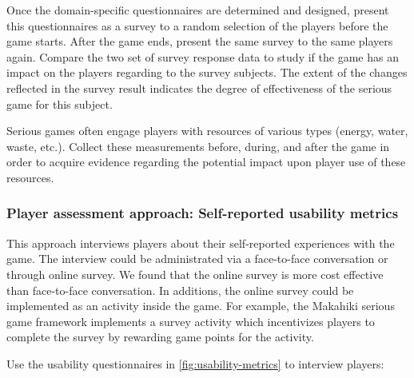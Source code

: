 \documentclass[11pt,oneside]{book}
\begin{document}
Once the domain-specific questionnaires are determined and designed, present this questionnaires as a survey to a random selection of the players before the game starts. After the game ends, present the same survey to the
same players again. Compare the two set of survey response data to study if the game has an impact on the players regarding to the survey subjects. The extent of the changes reflected in the survey result indicates the degree of effectiveness of the serious game for this subject.

Serious games often engage players with resources of various types (energy, water, waste, etc.). Collect these measurements before, during, and after the game in order to acquire evidence regarding the potential impact upon player use of these resources.

\subsubsection{Player assessment approach: Self-reported usability metrics}
\label{Self-reported usability metrics}

This approach interviews players about their self-reported experiences with the game. The interview could be administrated via a face-to-face conversation or through 
online survey. We found that the online survey is more cost effective than face-to-face conversation. 
In additions, the online survey could be implemented as an activity inside the game. For example, the Makahiki serious game framework implements a survey activity which incentivizes players to complete the survey by rewarding game points for the activity.

Use the usability questionnaires in \autoref{fig:usability-metrics} to interview players:\\
\end{document}
